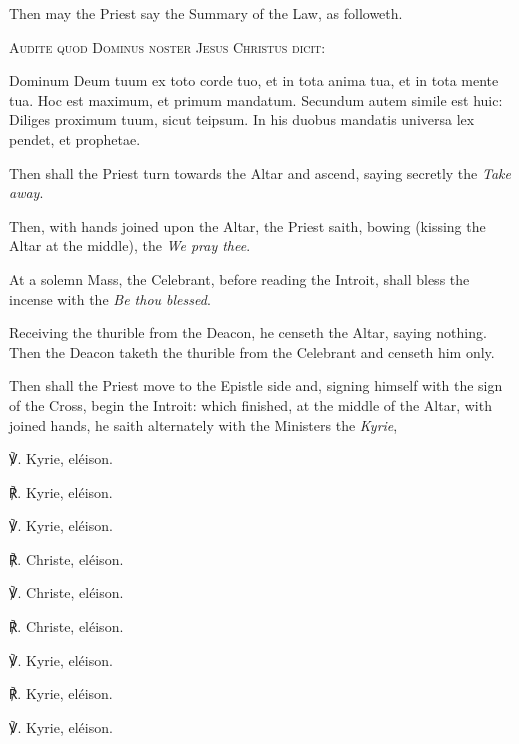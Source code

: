 \begin{rubric}
	Then may the Priest say the Summary of the Law, as followeth.
\end{rubric}
\begin{center}
	{\textsc{Audite quod Dominus noster Jesus Christus dicit:}}
\end{center}
 Dominum Deum tuum ex toto corde tuo, et in tota anima tua, et in tota mente tua. Hoc est maximum, et primum mandatum. Secundum autem simile est huic: Diliges proximum tuum, sicut teipsum. In his duobus mandatis universa lex pendet, et prophetae. 
\begin{rubric}
    Then shall the Priest turn towards the Altar and ascend, saying secretly the \emph{Take away}.
\end{rubric}
\begin{rubric}
    Then, with hands joined upon the Altar, the Priest saith, bowing (kissing the Altar at the middle), the \emph{We pray thee}.
\end{rubric}
\begin{rubric}
    At a solemn Mass, the Celebrant, before reading the Introit, shall bless the incense with the \emph{Be thou blessed}.
\end{rubric}
\begin{rubric}
	Receiving the thurible from the Deacon, he censeth the Altar, saying nothing. Then the Deacon taketh the thurible from the Celebrant and censeth him only.
\end{rubric}
\begin{rubric}
    Then shall the Priest move to the Epistle side and, signing himself with the sign of the Cross, begin the Introit: which finished, at the middle of the Altar, with joined hands, he saith alternately with the Ministers the \emph{Kyrie},
\end{rubric}
\begin{multicols}{3}
	℣. Kyrie, eléison.

℟. Kyrie, eléison.

℣. Kyrie, eléison.

\columnbreak
℟. Christe, eléison.

℣. Christe, eléison.

℟. Christe, eléison.

\columnbreak
℣. Kyrie, eléison.

℟. Kyrie, eléison.

℣. Kyrie, eléison.
\end{multicols}



